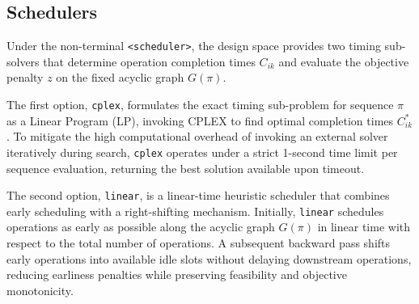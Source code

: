 \subsection{Schedulers}
\label{subsec:exact_subsolvers}

Under the non-terminal \texttt{<scheduler>}, the design space provides two timing sub-solvers that determine operation completion times $C_{ik}$ and evaluate the objective penalty $z$ on the fixed acyclic graph $G(\pi)$.

The first option, \texttt{cplex}, formulates the exact timing sub-problem for sequence $\pi$ as a Linear Program (LP), invoking CPLEX to find optimal completion times $C_{ik}^*$.
To mitigate the high computational overhead of invoking an external solver iteratively during search, \texttt{cplex} operates under a strict 1-second time limit per sequence evaluation, returning the best solution available upon timeout.

The second option, \texttt{linear}, is a linear-time heuristic scheduler that combines early scheduling with a right-shifting mechanism.
Initially, \texttt{linear} schedules operations as early as possible along the acyclic graph $G(\pi)$ in linear time with respect to the total number of operations.
A subsequent backward pass shifts early operations into available idle slots without delaying downstream operations, reducing earliness penalties while preserving feasibility and objective monotonicity.
